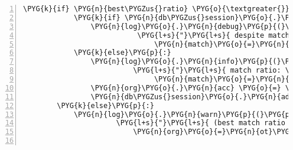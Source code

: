 \begin{Verbatim}[commandchars=\\\{\},numbers=left,firstnumber=1,stepnumber=5]
        \PYG{k}{if} \PYG{n}{best\PYGZus{}ratio} \PYG{o}{\textgreater{}} \PYG{l+m+mf}{0.8}\PYG{p}{:}
            \PYG{k}{if} \PYG{n}{db\PYGZus{}session}\PYG{o}{.}\PYG{n}{query}\PYG{p}{(}\PYG{n}{UCSCOrganism}\PYG{p}{)}\PYG{o}{.}\PYG{n}{get}\PYG{p}{(}\PYG{n}{best\PYGZus{}match}\PYG{p}{)}\PYG{p}{:}
                \PYG{n}{log}\PYG{o}{.}\PYG{n}{debug}\PYG{p}{(}\PYG{p}{(}\PYG{l+s}{"}\PYG{l+s}{NOT using }\PYG{l+s}{'}\PYG{l+s}{\PYGZob{}match\PYGZcb{}}\PYG{l+s}{'}\PYG{l+s}{ for }\PYG{l+s}{'}\PYG{l+s}{\PYGZob{}org\PYGZcb{}}\PYG{l+s}{'}\PYG{l+s}{"}
                           \PYG{l+s}{"}\PYG{l+s}{ despite match ratio of: \PYGZob{}ratio\PYGZcb{}}\PYG{l+s}{"}\PYG{p}{)}\PYG{o}{.}\PYG{n}{format}\PYG{p}{(}
                               \PYG{n}{match}\PYG{o}{=}\PYG{n}{best\PYGZus{}match\PYGZus{}t}\PYG{p}{,} \PYG{n}{org}\PYG{o}{=}\PYG{n}{ot}\PYG{p}{,} \PYG{n}{ratio}\PYG{o}{=}\PYG{n}{best\PYGZus{}ratio}\PYG{p}{)}\PYG{p}{)}
            \PYG{k}{else}\PYG{p}{:}
                \PYG{n}{log}\PYG{o}{.}\PYG{n}{info}\PYG{p}{(}\PYG{p}{(}\PYG{l+s}{"}\PYG{l+s}{using }\PYG{l+s}{'}\PYG{l+s}{\PYGZob{}match\PYGZcb{}}\PYG{l+s}{'}\PYG{l+s}{ for }\PYG{l+s}{'}\PYG{l+s}{\PYGZob{}org\PYGZcb{}}\PYG{l+s}{'}\PYG{l+s}{"}
                          \PYG{l+s}{"}\PYG{l+s}{ match ratio: \PYGZob{}ratio\PYGZcb{}}\PYG{l+s}{"}\PYG{p}{)}\PYG{o}{.}\PYG{n}{format}\PYG{p}{(}
                               \PYG{n}{match}\PYG{o}{=}\PYG{n}{best\PYGZus{}match\PYGZus{}t}\PYG{p}{,} \PYG{n}{org}\PYG{o}{=}\PYG{n}{ot}\PYG{p}{,} \PYG{n}{ratio}\PYG{o}{=}\PYG{n}{best\PYGZus{}ratio}\PYG{p}{)}\PYG{p}{)}
                \PYG{n}{org}\PYG{o}{.}\PYG{n}{acc} \PYG{o}{=} \PYG{n}{best\PYGZus{}match}
                \PYG{n}{db\PYGZus{}session}\PYG{o}{.}\PYG{n}{add}\PYG{p}{(}\PYG{n}{org}\PYG{p}{)}
        \PYG{k}{else}\PYG{p}{:}
            \PYG{n}{log}\PYG{o}{.}\PYG{n}{warn}\PYG{p}{(}\PYG{p}{(}\PYG{l+s}{"}\PYG{l+s}{'}\PYG{l+s}{\PYGZob{}org\PYGZcb{}}\PYG{l+s}{'}\PYG{l+s}{ not found in NCBI }\PYG{l+s}{'}\PYG{l+s}{genome}\PYG{l+s}{'}\PYG{l+s}{ database}\PYG{l+s}{"}
                      \PYG{l+s}{"}\PYG{l+s}{ (best match ratio only \PYGZob{}ratio\PYGZcb{})}\PYG{l+s}{"}\PYG{p}{)}\PYG{o}{.}\PYG{n}{format}\PYG{p}{(}
                          \PYG{n}{org}\PYG{o}{=}\PYG{n}{ot}\PYG{p}{,} \PYG{n}{ratio}\PYG{o}{=}\PYG{n}{best\PYGZus{}ratio}\PYG{p}{)}\PYG{p}{)}


\end{Verbatim}
